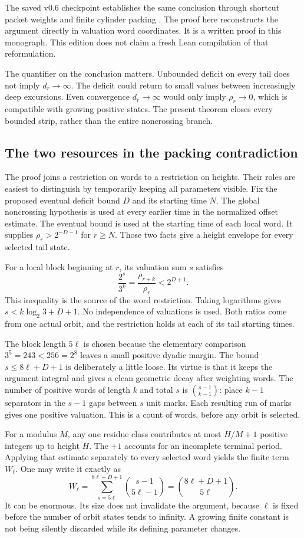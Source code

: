 The saved v0.6 checkpoint establishes the same conclusion through shortcut packet weights and finite cylinder packing \cite{projectcollatzbounded}. The proof here reconstructs the argument directly in valuation word coordinates. It is a written proof in this monograph. This edition does not claim a fresh Lean compilation of that reformulation.

The quantifier on the conclusion matters. Unbounded deficit on every tail does not imply $d_r\to\infty$. The deficit could return to small values between increasingly deep excursions. Even convergence $d_r\to\infty$ would only imply $\rho_r\to0$, which is compatible with growing positive states. The present theorem closes every bounded strip, rather than the entire noncrossing branch.

\subsection{The two resources in the packing contradiction}
The proof joins a restriction on words to a restriction on heights. Their roles are easiest to distinguish by temporarily keeping all parameters visible. Fix the proposed eventual deficit bound $D$ and its starting time $N$. The global noncrossing hypothesis is used at every earlier time in the normalized offset estimate. The eventual bound is used at the starting time of each local word. It supplies $\rho_r>2^{-D-1}$ for $r\ge N$. Those two facts give a height envelope for every selected tail state.

For a local block beginning at $r$, its valuation sum $s$ satisfies
\[
\frac{2^s}{3^k}=\frac{\rho_{r+k}}{\rho_r}<2^{D+1}.
\]
This inequality is the source of the word restriction. Taking logarithms gives $s<k\log_2 3+D+1$. No independence of valuations is used. Both ratios come from one actual orbit, and the restriction holds at each of its tail starting times.

The block length $5\ell$ is chosen because the elementary comparison $3^5=243<256=2^8$ leaves a small positive dyadic margin. The bound $s\le8\ell+D+1$ is deliberately a little loose. Its virtue is that it keeps the argument integral and gives a clean geometric decay after weighting words. The number of positive words of length $k$ and total $s$ is $\binom{s-1}{k-1}$: place $k-1$ separators in the $s-1$ gaps between $s$ unit marks. Each resulting run of marks gives one positive valuation. This is a count of words, before any orbit is selected.

For a modulus $M$, any one residue class contributes at most $H/M+1$ positive integers up to height $H$. The $+1$ accounts for an incomplete terminal period. Applying that estimate separately to every selected word yields the finite term $W_\ell$. One may write it exactly as
\[
W_\ell=\sum_{s=5\ell}^{8\ell+D+1}\binom{s-1}{5\ell-1}
=\binom{8\ell+D+1}{5\ell}.
\]
It can be enormous. Its size does not invalidate the argument, because $\ell$ is fixed before the number of orbit states tends to infinity. A growing finite constant is not being silently discarded while its defining parameter changes.

